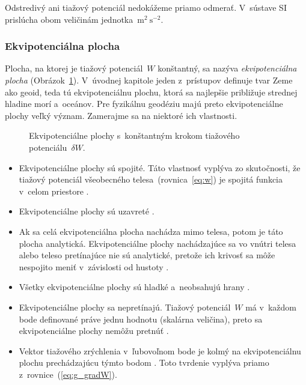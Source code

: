\documentclass[a4paper, 12pt]{book}
\begin{document}
Odstredivý ani tiažový potenciál nedokážeme priamo odmerať.  V~sústave SI 
prislúcha obom veličinám jednotka~$\mathrm{m}^2 \ \mathrm{s}^{-2}$.

\subsubsection{Ekvipotenciálna plocha}
\label{sec:equipotential_surface}

Plocha, na ktorej je tiažový potenciál~$W$ konštantný, sa nazýva 
\emph{ekvipotenciálna plocha} (Obrázok~\ref{fig:equipotential_surfaces}).  
V~úvodnej kapitole jeden z~prístupov definuje tvar Zeme ako geoid, teda tú 
ekvipotenciálnu plochu, ktorá sa najlepšie približuje strednej hladine morí 
a~oceánov.  Pre fyzikálnu geodéziu majú preto ekvipotenciálne plochy veľký 
význam.  Zamerajme sa na niektoré ich vlastnosti.

\begin{figure}
\centering

\caption{Ekvipotenciálne plochy s~konštantným krokom tiažového 
potenciálu~$\delta W$.}
\label{fig:equipotential_surfaces}
\end{figure}

\begin{itemize}
\item Ekvipotenciálne plochy sú spojité.  Táto vlastnosť vyplýva zo
skutočnosti, že tiažový potenciál všeobecného telesa~(rovnica~\ref{eq:w}) je 
spojitá funkcia v~celom priestore \parencite{MoritzPhysicalGeodesy}.

\item Ekvipotenciálne plochy sú uzavreté \parencite{VanicekGeodesy}.

\item Ak sa celá ekvipotenciálna plocha nachádza mimo telesa, potom je táto 
plocha analytická.  Ekvipotenciálne plochy nachádzajúce sa vo vnútri telesa 
alebo teleso pretínajúce nie sú analytické, pretože ich krivosť sa môže 
nespojito meniť v~závislosti od hustoty \parencite{MoritzPhysicalGeodesy}.

\item Všetky ekvipotenciálne plochy sú hladké a~neobsahujú hrany
\parencite{MoritzPhysicalGeodesy}.

\item Ekvipotenciálne plochy sa nepretínajú.  Tiažový potenciál~$W$ má v~každom 
bode definované práve jednu hodnotu (skalárna veličina), preto sa 
ekvipotenciálne plochy nemôžu pretnúť \parencite{MacMillan1930}.

\item Vektor tiažového zrýchlenia v~ľubovoľnom bode je kolmý na ekvipotenciálnu
plochu prechádzajúcu týmto bodom \parencite{MoritzPhysicalGeodesy}.  Toto 
tvrdenie vyplýva priamo z~rovnice~(\ref{eq:g_gradW}).
\end{itemize}
\end{document}
